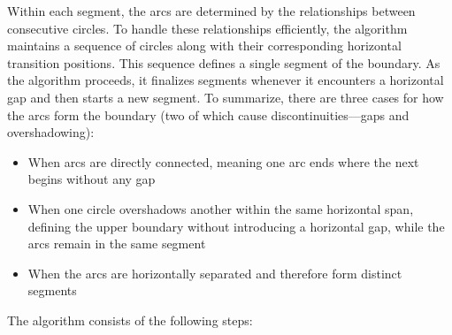 \documentclass[12pt]{article}
\begin{document}
Within each segment, the arcs are determined by the relationships between
consecutive circles. To handle these relationships efficiently, the algorithm maintains a
sequence of circles along with their corresponding horizontal transition positions. This
sequence defines a single segment of the boundary. As the algorithm proceeds, it finalizes
segments whenever it encounters a horizontal gap and then starts a new segment. To
summarize, there are three cases for how the arcs form the boundary (two of which cause
discontinuities---gaps and overshadowing):

\begin{itemize}
    \item When arcs are directly connected, meaning one arc ends where the next begins
    without any gap
    \item When one circle overshadows another within the same horizontal span, defining
    the upper boundary without introducing a horizontal gap, while the arcs remain in
    the same segment
    \item When the arcs are horizontally separated and therefore form distinct segments
\end{itemize}

The algorithm consists of the following steps:
\end{document}
